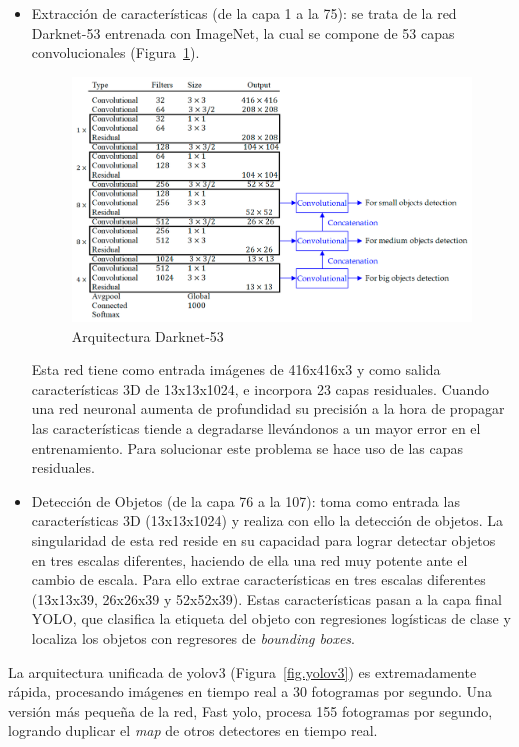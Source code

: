 \begin{itemize}
    \item Extracción de características (de la capa 1 a la 75): se trata de la red Darknet-53 entrenada con ImageNet, la cual se compone de 53 capas convolucionales (Figura~\ref{fig.darknet53}).
    \begin{figure}[H] 
\begin{center}
	\includegraphics[scale=1]{figures/Diseno_global/darket53.png}
   \caption{Arquitectura Darknet-53}
	\label{fig.darknet53}
\end{center}
\end{figure}
	Esta red tiene como entrada imágenes de 416x416x3 y como salida características 3D de 13x13x1024, e incorpora 23 capas residuales. Cuando una red neuronal aumenta de profundidad su precisión a la hora de propagar las características tiende a degradarse llevándonos a un mayor error en el entrenamiento. Para solucionar este problema se hace uso de las capas residuales.
    \item Detección de Objetos (de la capa 76 a la 107): toma como entrada las características 3D (13x13x1024) y realiza con ello la detección de objetos. La singularidad de esta red reside en su capacidad para lograr detectar objetos en tres escalas diferentes, haciendo de ella una red muy potente ante el cambio de escala. Para ello extrae características en tres escalas diferentes (13x13x39, 26x26x39 y 52x52x39). Estas características pasan a la capa final YOLO, que clasifica la etiqueta del objeto con regresiones logísticas de clase y localiza los objetos con regresores de \textit{bounding boxes}.

\end{itemize}


La arquitectura unificada de \acrshort{yolo}v3 (Figura~\ref{fig.yolov3}) es extremadamente rápida, procesando imágenes en tiempo real a 30 fotogramas por segundo. Una versión más pequeña de la red, Fast \acrshort{yolo}, procesa 155 fotogramas por segundo, logrando duplicar el \textit{\acrfull{map}} de otros detectores en tiempo real.

